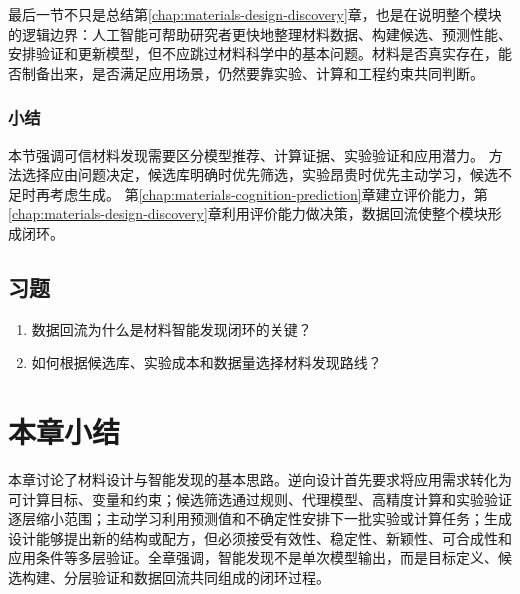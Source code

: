 最后一节不只是总结第\ref{chap:materials-design-discovery}章，也是在说明整个模块的逻辑边界：人工智能可帮助研究者更快地整理材料数据、构建候选、预测性能、安排验证和更新模型，但不应跳过材料科学中的基本问题。材料是否真实存在，能否制备出来，是否满足应用场景，仍然要靠实验、计算和工程约束共同判断。

\subsubsection*{\textbf{小结}}

本节强调可信材料发现需要区分模型推荐、计算证据、实验验证和应用潜力。
方法选择应由问题决定，候选库明确时优先筛选，实验昂贵时优先主动学习，候选不足时再考虑生成。
第\ref{chap:materials-cognition-prediction}章建立评价能力，第\ref{chap:materials-design-discovery}章利用评价能力做决策，数据回流使整个模块形成闭环。

\subsection*{习题}

\begin{enumerate}[leftmargin=*]
\item 数据回流为什么是材料智能发现闭环的关键？
\item 如何根据候选库、实验成本和数据量选择材料发现路线？
\end{enumerate}

\section*{本章小结}

本章讨论了材料设计与智能发现的基本思路。逆向设计首先要求将应用需求转化为可计算目标、变量和约束；候选筛选通过规则、代理模型、高精度计算和实验验证逐层缩小范围；主动学习利用预测值和不确定性安排下一批实验或计算任务；生成设计能够提出新的结构或配方，但必须接受有效性、稳定性、新颖性、可合成性和应用条件等多层验证。全章强调，智能发现不是单次模型输出，而是目标定义、候选构建、分层验证和数据回流共同组成的闭环过程。
